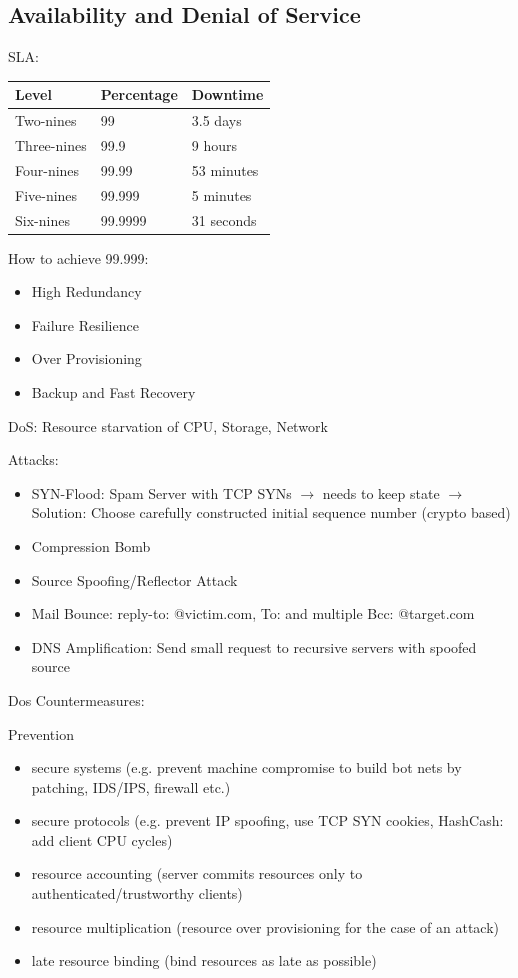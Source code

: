 \documentclass[fs, footer]{latex4ei}
\begin{document}
\begin{multicols*}{4}
\section{Availability and Denial of Service}
SLA:
		\begin{tabular}{ l | l | l }
		Level & Percentage & Downtime \\ \hline
		Two-nines & 99 & 3.5 days \\
		Three-nines & 99.9 & 9 hours \\
		Four-nines & 99.99 & 53 minutes \\
		Five-nines & 99.999 & 5 minutes \\
		Six-nines & 99.9999 & 31 seconds \\
		\end{tabular}

How to achieve 99.999:
\begin{itemize}
	\item High Redundancy
	\item Failure Resilience
	\item Over Provisioning
	\item Backup and Fast Recovery 
\end{itemize}

DoS: Resource starvation of CPU, Storage, Network

Attacks:
\begin{itemize}
	\item SYN-Flood: Spam Server with TCP SYNs $\rightarrow$ needs to keep state $\rightarrow$ Solution: Choose carefully constructed initial sequence number (crypto based)
	\item Compression Bomb
	\item Source Spoofing/Reflector Attack
	\item Mail Bounce: reply-to: @victim.com, To: and multiple Bcc: @target.com
	\item DNS Amplification: Send small request to recursive servers with spoofed source
\end{itemize}

Dos Countermeasures:

Prevention
\begin{itemize}
	\item secure systems (e.g. prevent machine compromise to build bot
	nets by patching, IDS/IPS, firewall etc.)
	\item secure protocols (e.g. prevent IP spoofing, use TCP SYN
	cookies, HashCash: add client CPU cycles)
	\item resource accounting (server commits resources only to
	authenticated/trustworthy clients)
	\item resource multiplication (resource over provisioning for the case
	of an attack)
	\item late resource binding (bind resources as late as possible)
\end{itemize}


\end{multicols*}
\end{document}
